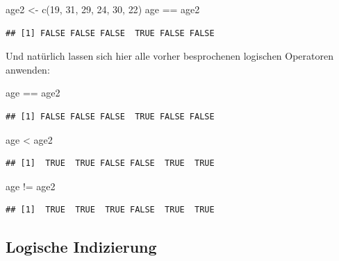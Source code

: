 \documentclass[
]{book}
\newenvironment{Shaded}{\begin{snugshade}}{\end{snugshade}}
\newcommand{\DecValTok}[1]{\textcolor[rgb]{0.00,0.00,0.81}{#1}}
\newcommand{\FunctionTok}[1]{\textcolor[rgb]{0.00,0.00,0.00}{#1}}
\newcommand{\NormalTok}[1]{#1}
\newcommand{\OtherTok}[1]{\textcolor[rgb]{0.56,0.35,0.01}{#1}}
\newcommand{\SpecialCharTok}[1]{\textcolor[rgb]{0.00,0.00,0.00}{#1}}
\begin{document}
\begin{Shaded}
\begin{Highlighting}[]
\NormalTok{age2 }\OtherTok{\textless{}{-}} \FunctionTok{c}\NormalTok{(}\DecValTok{19}\NormalTok{, }\DecValTok{31}\NormalTok{, }\DecValTok{29}\NormalTok{, }\DecValTok{24}\NormalTok{, }\DecValTok{30}\NormalTok{, }\DecValTok{22}\NormalTok{)}
\NormalTok{age }\SpecialCharTok{==}\NormalTok{ age2}
\end{Highlighting}
\end{Shaded}

\begin{verbatim}
## [1] FALSE FALSE FALSE  TRUE FALSE FALSE
\end{verbatim}

Und natürlich lassen sich hier alle vorher besprochenen logischen Operatoren anwenden:

\begin{Shaded}
\begin{Highlighting}[]
\NormalTok{age }\SpecialCharTok{==}\NormalTok{ age2 }
\end{Highlighting}
\end{Shaded}

\begin{verbatim}
## [1] FALSE FALSE FALSE  TRUE FALSE FALSE
\end{verbatim}

\begin{Shaded}
\begin{Highlighting}[]
\NormalTok{age }\SpecialCharTok{\textless{}}\NormalTok{ age2 }
\end{Highlighting}
\end{Shaded}

\begin{verbatim}
## [1]  TRUE  TRUE FALSE FALSE  TRUE  TRUE
\end{verbatim}

\begin{Shaded}
\begin{Highlighting}[]
\NormalTok{age }\SpecialCharTok{!=}\NormalTok{ age2}
\end{Highlighting}
\end{Shaded}

\begin{verbatim}
## [1]  TRUE  TRUE  TRUE FALSE  TRUE  TRUE
\end{verbatim}

\hypertarget{logische-indizierung}{%
\subsection{Logische Indizierung}\label{logische-indizierung}}
\end{document}
